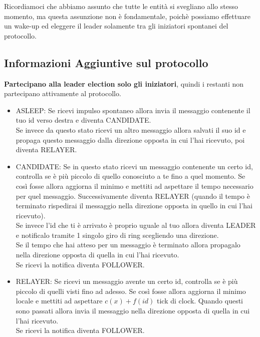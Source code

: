 Ricordiamoci che abbiamo assunto che tutte le entità si svegliano allo stesso
momento, ma questa assunzione non è fondamentale, poichè possiamo effettuare un
wake-up ed eleggere il leader solamente tra gli iniziatori spontanei del
protocollo.

\subsection{Informazioni Aggiuntive sul protocollo}
\textbf{Partecipano alla leader election solo gli iniziatori}, quindi i restanti
non partecipano attivamente al protocollo.

\begin{itemize}
    \item ASLEEP: Se ricevi impulso spontaneo allora invia il messaggio contenente
          il tuo id verso destra e diventa CANDIDATE.\\
          Se invece da questo stato ricevi un altro messaggio allora salvati il
          suo id e propaga questo messaggio dalla direzione opposta in cui l'hai
          ricevuto, poi diventa RELAYER.
    \item CANDIDATE: Se in questo stato ricevi un messaggio contenente un certo
          id, controlla se è più piccolo di quello conosciuto a te fino a quel momento.
          Se così fosse allora aggiorna il minimo e mettiti ad aspettare il tempo
          necessario per quel messaggio. Successivamente diventa RELAYER (quando il
          tempo è terminato rispedirai il messaggio nella direzione opposta in quello in
          cui l'hai ricevuto).\\
          Se invece l'id che ti è arrivato è proprio uguale al tuo allora diventa
          LEADER e notificalo tramite 1 singolo giro di ring scegliendo una
          direzione.\\
          Se il tempo che hai atteso per un messaggio è terminato allora propagalo
          nella direzione opposta di quella in cui l'hai ricevuto.\\
          Se ricevi la notifica diventa FOLLOWER.
    \item RELAYER: Se ricevi un messaggio avente un certo id, controlla se è più
          piccolo di quelli visti fino ad adesso. Se così fosse allora aggiorna il
          minimo locale e mettiti ad aspettare $c(x)+f(id)$ tick di clock. Quando questi
          sono passati allora invia il messaggio nella direzione opposta di quella in
          cui l'hai ricevuto.\\
          Se ricevi la notifica diventa FOLLOWER.

\end{itemize}

